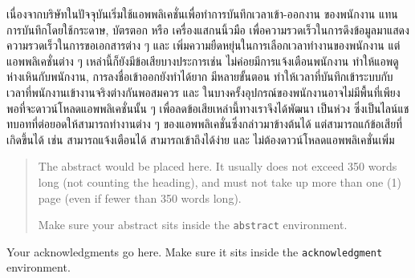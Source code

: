 \maketitle
\makesignature

\ifproject
\begin{abstractTH}

เนื่องจากบริษัทในปัจจุบันเริ่มใช้แอพพลิเคชั่นเพื่อทำการบันทึกเวลาเข้า-ออกงาน ของพนักงาน แทนการบันทึกโดยใช้กระดาษ, บัตรตอก หรือ เครื่องแสกนนิ้วมือ
\enskip เพื่อความรวดเร็วในการดึงข้อมูลมาแสดง ความรวดเร็วในการขอเอกสารต่าง ๆ และ เพิ่มความยืดหยุ่นในการเลือกเวลาทำงานของพนักงาน
\enskip แต่แอพพลิเคชั่นต่าง ๆ เหล่านี้ก็ยังมีข้อเสียบางประการเช่น ไม่ค่อยมีการแจ้งเตือนพนักงาน ทำให้แอพดูห่างเหินกับพนักงาน, 
การลงชื่อเข้าออกยังทำได้ยาก มีหลายขั้นตอน ทำให้เวลาที่บันทึกเข้าระบบกับเวลาที่พนักงานเข้างานจริงต่างกันพอสมควร 
และ ในบางครั้งอุปกรณ์ของพนักงานอาจไม่มีพื้นที่เพียงพอที่จะดาวน์โหลดแอพพลิเคชั่นนั้น ๆ
\enskip เพื่อลดข้อเสียเหล่านี้ทางเราจึงได้พัฒนา เป็นห่วง ซึ่งเป็นไลน์แชทบอทที่ต่อยอดให้สามารถทำงานต่าง ๆ ของแอพพลิเคชั่นซึ่งกล่าวมาข้างต้นได้
แต่สามารถแก้ข้อเสียที่เกิดขึ้นได้ เช่น สามารถแจ้งเตือนได้ สามารถเข้าถึงได้ง่าย และ ไม่ต้องดาวน์โหลดแอพพลิเคชั่นเพิ่ม

\end{abstractTH}


\begin{abstract}
The abstract would be placed here. It usually does not exceed 350 words
long (not counting the heading), and must not take up more than one (1) page
(even if fewer than 350 words long).

Make sure your abstract sits inside the \texttt{abstract} environment.
\end{abstract}

\iffalse
\begin{dedication}
This document is dedicated to all Chiang Mai University students.

Dedication page is optional.
\end{dedication}
\fi %

\begin{acknowledgments}
Your acknowledgments go here. Make sure it sits inside the
\texttt{acknowledgment} environment.

\end{acknowledgments}%
\fi %

\contentspage

\ifproject
\figurelistpage

\tablelistpage
\fi %



